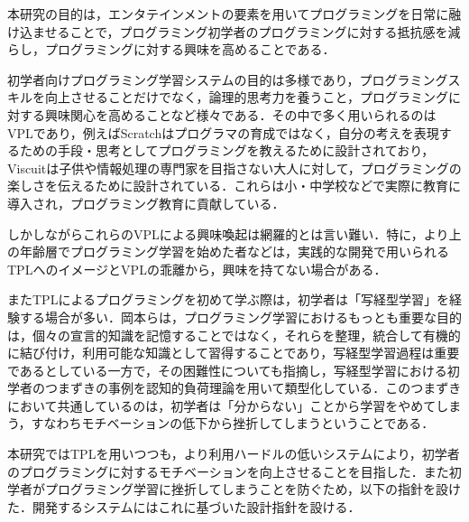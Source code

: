


本研究の目的は，エンタテインメントの要素を用いてプログラミングを日常に融け込ませることで，プログラミング初学者のプログラミングに対する抵抗感を減らし，プログラミングに対する興味を高めることである．

初学者向けプログラミング学習システムの目的は多様であり，プログラミングスキルを向上させることだけでなく，論理的思考力を養うこと，プログラミングに対する興味関心を高めることなど様々である．その中で多く用いられるのはVPLであり，例えばScratchはプログラマの育成ではなく，自分の考えを表現するための手段・思考としてプログラミングを教えるために設計されており，Viscuitは子供や情報処理の専門家を目指さない大人に対して，プログラミングの楽しさを伝えるために設計されている．これらは小・中学校などで実際に教育に導入され，プログラミング教育に貢献している．

しかしながらこれらのVPLによる興味喚起は網羅的とは言い難い．特に，より上の年齢層でプログラミング学習を始めた者などは，実践的な開発で用いられるTPLへのイメージとVPLの乖離から，興味を持てない場合がある．

またTPLによるプログラミングを初めて学ぶ際は，初学者は「写経型学習」を経験する場合が多い．岡本らは，プログラミング学習におけるもっとも重要な目的は，個々の宣言的知識を記憶することではなく，それらを整理，統合して有機的に結び付け，利用可能な知識として習得することであり，写経型学習過程は重要であるとしている一方で，その困難性についても指摘し，写経型学習における初学者のつまずきの事例を認知的負荷理論を用いて類型化している\cite{okamoto}．このつまずきにおいて共通しているのは，初学者は「分からない」ことから学習をやめてしまう，すなわちモチベーションの低下から挫折してしまうということである．

本研究ではTPLを用いつつも，より利用ハードルの低いシステムにより，初学者のプログラミングに対するモチベーションを向上させることを目指した．また初学者がプログラミング学習に挫折してしまうことを防ぐため，以下の指針を設けた．開発するシステムにはこれに基づいた設計指針を設ける．


